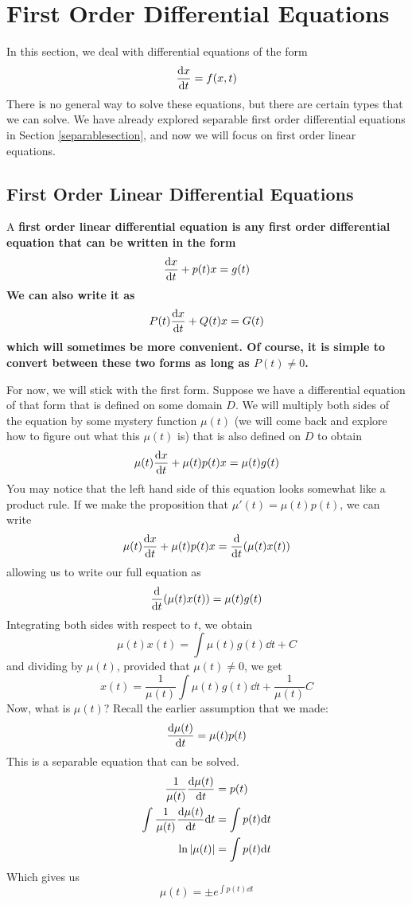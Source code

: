 \section{First Order Differential Equations}
In this section, we deal with differential equations of the form
\[ \dv{x}{t} = f(x, t) \]
There is no general way to solve these equations, but there are certain types that we can solve. We have already explored separable first order differential equations in Section \ref{separablesection}, and now we will focus on first order linear equations.
\subsection{First Order Linear Differential Equations}
A \bf{first order linear differential equation} is any first order differential equation that can be written in the form
\[ \dv{x}{t} + p(t)x = g(t) \]
We can also write it as
\[ P(t)\dv{x}{t} + Q(t)x = G(t)\]
which will sometimes be more convenient. Of course, it is simple to convert between these two forms as long as $P(t)\neq 0$. \par
For now, we will stick with the first form. Suppose we have a differential equation of that form that is defined on some domain $D$. We will multiply both sides of the equation by some mystery function $\mu(t)$ (we will come back and explore how to figure out what this $\mu(t)$ is) that is also defined on $D$ to obtain
\[ \mu(t) \dv{x}{t} + \mu(t)p(t)x = \mu(t)g(t) \]
You may notice that the left hand side of this equation looks somewhat like a product rule. If we make the proposition that $\mu '(t) = \mu(t)p(t)$, we can write 
\[ \mu(t)\dv{x}{t} + \mu(t)p(t)x = \dv{t} \pqty{\mu(t)x(t)} \]
allowing us to write our full equation as
\[ \dv{t} \pqty{\mu(t)x(t)} = \mu(t)g(t) \]
Integrating both sides with respect to $t$, we obtain
\[ \mu(t)x(t) = \int \mu(t)g(t)\dd t + C\]
and dividing by $\mu(t)$, provided that $\mu(t)\neq 0$, we get
\[ x(t) = \frac{1}{\mu(t)}\int \mu(t)g(t)\dd t + \frac{1}{\mu(t)}C \]
Now, what is $\mu(t)$? Recall the earlier assumption that we made:
\[ \dv{\mu(t)}{t} = \mu(t)p(t) \]
This is a separable equation that can be solved.
\begin{align*}
    \frac{1}{\mu(t)}\dv{\mu(t)}{t} &= p(t) \\
    \int \frac{1}{\mu(t)}\dv{\mu(t)}{t}\dd t &= \int p(t)\dd t \\
    \ln\abs{\mu(t)} &= \int p(t)\dd t
\end{align*}
Which gives us
\[ \mu(t) = \pm e^{\int p(t)\dd t} \]
